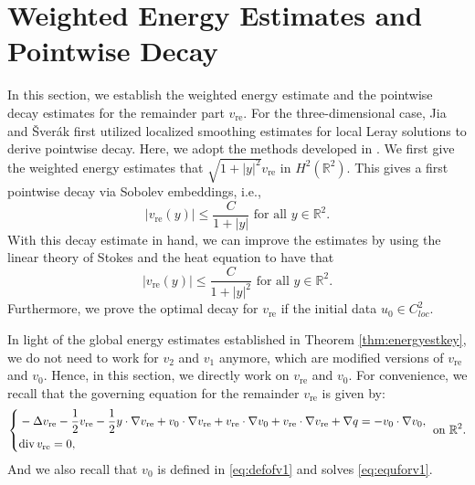 \documentclass[12pt]{amsart}
\renewcommand{\div}{{\rm div \thinspace }}
\numberwithin{equation}{section}              %
\theoremstyle{remark}
\begin{document}
		
			
		
		
		
		
		
		
		
		
		
		
		
		
			
				
			
			
		
		\section{Weighted Energy Estimates and Pointwise Decay}\label{sec:pointwise}
		In this section, we establish the weighted energy estimate and the pointwise decay estimates for the remainder part $v_{\text{re}}$. For the three-dimensional case, Jia and \v{S}ver\'{a}k \cite{Jia14} first utilized localized smoothing estimates for local Leray solutions to derive pointwise decay. Here, we adopt the 
		methods developed in  \cite{Lai19}. We first give the weighted energy estimates that $\sqrt{1+|y|^2}v_{\text{re}}$ in $H^2(\mathbb{R}^2)$. This gives a first pointwise decay via Sobolev embeddings, i.e.,
		\begin{equation*}
			|v_{\text{re}} (y)| \leq \frac{C}{	1 + |y| } \textrm{ for all } y \in \mathbb{R}^2.
		\end{equation*}
		With this decay estimate in hand, we can improve the estimates  by  using the linear theory of Stokes and the heat equation to have that
		\begin{equation*}
			|v_{\text{re}} (y)| \leq \frac{C}{	1 + |y|^2}\textrm{ for all } y \in \mathbb{R}^2.
		\end{equation*}
		Furthermore, we  prove the optimal decay for $v_{\text{re}}$ if the initial data $u_0\in C^2_{loc}$.

        
		In light of the global energy estimates established in Theorem \ref{thm:energyestkey}, we do not need to work for $v_{2}$ and $v_1$ anymore,
		which are modified versions of $v_{\text{re}}$ and $v_0$. Hence, in this section, we directly work on $v_{\text{re}}$ and $v_0$. 
		For convenience, we recall that the governing equation for the remainder $v_{\text{re}}$ is given by:
		\begin{equation}\label{eq:differencereca}
			\left\{
			\begin{aligned}
				&-\Delta v_{\text{re}} -\frac{1}{2}v_{\text{re}} -\frac{1}{2}y\cdot \nabla v_{\text{re}}+  v_0\cdot \nabla v_{\text{re}} + v_{\text{re}}\cdot \nabla  v_0 + v_{\text{re}}\cdot \nabla v_{\text{re}} +\nabla q=- v_0\cdot\nabla  v_0, \\
				&  \div v_{\text{re}}=0,
			\end{aligned}
			\right. \textrm{ on } \mathbb{R}^2.
		\end{equation}
		And we also recall that $v_0$ is defined in \eqref{eq:defofv1} and solves \eqref{eq:equforv1}.		
\end{document}
